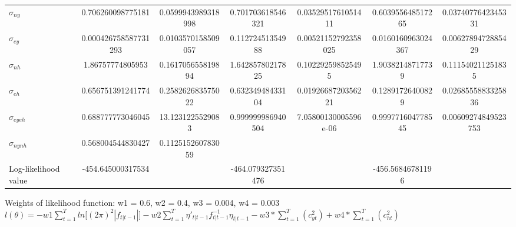 \documentclass[
  12pt,
]{article}
\begin{document}
\begin{landscape}
\begin{table}[]
\begin{threeparttable}
\begin{tabular}{@{}lSSSSSS@{}}
$\sigma_{ny}$ & 0.706260098775181 & 0.0599943989318998 & 0.701703618546321 & 0.0352951761051411 & 0.603955648517265 & 0.0374077642345331 \\[2pt] 

$\sigma_{ey}$ & 0.000426758587731293 & 0.0103570158509057 & 0.11272451354988 & 0.00521152792358025 & 0.0160160963024367 & 0.0062789472885429 \\[2pt] 

$\sigma_{nh}$ & 1.86757774805953 & 0.161705655819894 & 1.64285780217825 & 0.102292598525495 & 1.90382148717739 & 0.111540211251835 \\[2pt] 

$\sigma_{eh}$ & 0.656751391241774 & 0.258262683575022 & 0.63234948433104 & 0.0192668720356221 & 0.12891726400829 & 0.0268555883325836 \\[2pt] 

$\sigma_{eyeh}$ & 0.688777773046045 & 13.1231225529083 & 0.999999986940504 & 7.05800130005596e-06 & 0.999771604778545 & 0.00609274849523753 \\[2pt] 

$\sigma_{nynh}$ & 0.568004544830427 & 0.112515260783059 &  &  &  &  \\[2pt] 

Log-likelihood value & -454.645000317534 &  & -464.079327351476 &  & -456.56846781196 &  \\[2pt] 


                                        
                    \bottomrule
                \end{tabular}
            \begin{tablenotes}
                \small
                \item Weights of likelihood function: w1 = 0.6, w2 = 0.4, w3 = 0.004, w4 = 0.003\\
                $l(\theta) = -w1\sum_{t=1}^{T}ln\lbrack(2\pi)^2|f_{t|t-1}|\rbrack
                -w2\sum_{t=1}^{T}\eta'_{t|t-1}f^{-1}_{t|t-1}\eta_{t|t-1}
                - w3*\sum_{t=1}^{T}(c_{yt}^2) + w4*\sum_{t=1}^{T}(c_{ht}^2)$
            \end{tablenotes}
            \end{threeparttable}
            \end{table}
            
        \end{landscape}
        
        \clearpage
        
        \pagebreak
        
\end{document}
